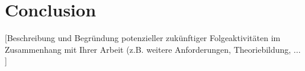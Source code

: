 \chapter{Conclusion}
[Beschreibung und Begr\"undung potenzieller zuk\"unftiger Folgeaktivit\"aten im Zusammenhang mit Ihrer Arbeit (z.B. weitere Anforderungen, Theoriebildung, ... ]

